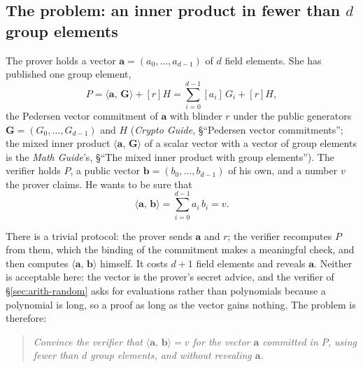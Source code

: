 \documentclass[11pt,a4paper]{article}
\theoremstyle{definition}
\newcommand{\ip}[2]{\langle #1,\, #2 \rangle}
\begin{document}
\subsection{The problem: an inner product in fewer than
  \texorpdfstring{$d$}{d} group elements}
\label{sec:ipa-problem}

The prover holds a vector $\mathbf a = (a_0, \dots, a_{d-1})$ of $d$
field elements. She has published one group element,
\[
P = \ip{\mathbf a}{\mathbf G} + [r]H
  = \sum_{i=0}^{d-1} [a_i]\,G_i + [r]H ,
\]
the Pedersen vector commitment of $\mathbf a$ with blinder $r$ under the
public generators $\mathbf G = (G_0, \dots, G_{d-1})$ and $H$
(\emph{Crypto Guide}, \S``Pedersen vector commitments''; the mixed inner
product $\ip{\mathbf a}{\mathbf G}$ of a scalar vector with a vector of
group elements is the \emph{Math Guide}'s, \S``The mixed inner product
with group elements''). The verifier holds $P$, a public vector
$\mathbf b = (b_0, \dots, b_{d-1})$ of his own, and a number $v$ the
prover claims. He wants to be sure that
\[
\ip{\mathbf a}{\mathbf b} = \sum_{i=0}^{d-1} a_i\,b_i = v .
\]

There is a trivial protocol: the prover sends $\mathbf a$ and $r$; the
verifier recomputes $P$ from them, which the binding of the commitment
makes a meaningful check, and then computes $\ip{\mathbf a}{\mathbf b}$
himself. It costs $d + 1$ field elements and reveals $\mathbf a$.
Neither is acceptable here: the vector is the prover's secret advice,
and the verifier of \S\ref{sec:arith-random} asks for evaluations rather
than polynomials because a polynomial is long, so a proof as long as the
vector gains nothing. The problem is therefore:

\begin{quote}
\emph{Convince the verifier that $\ip{\mathbf a}{\mathbf b} = v$ for the
vector $\mathbf a$ committed in $P$, using fewer than $d$ group
elements, and without revealing $\mathbf a$.}
\end{quote}
\end{document}
